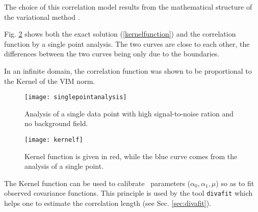 %
%
%
%
%
%
%

The choice of this correlation model results from the mathematical structure of the variational method \citep{BRASSEUR96}.

Fig. \ref{kernel1} shows both the exact solution (\ref{kernelfunction}) and the correlation function by a single point analysis. The two curves are close to each other, the differences between the two curves being only due to the boundaries.

In an infinite domain, the correlation function was shown to be proportional to the Kernel of the VIM norm.

\begin{figure}[H]
\centering
\texttt{[image: singlepointanalysis]}
\caption{Analysis of a single data point with high signal-to-noise ration and no background field.\label{singleanalysis}}
\end{figure}

\begin{figure}[H]
\centering
\texttt{[image: kernelf]}
\caption{Kernel function is given in red, while the blue curve comes from the analysis of a single point.\label{kernel1}}
\end{figure}


The Kernel function can be used to calibrate \diva\, parameters ($\alpha_0, \alpha_1, \mu$) so as to fit observed covariance functions. This principle is used by the tool \texttt{divafit} which helps one to estimate the correlation length (see Sec. \ref{sec:divafit}).

